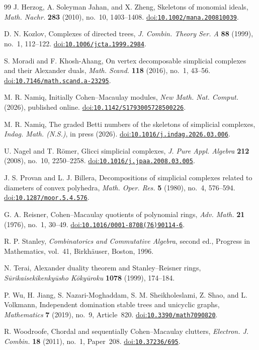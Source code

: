 \documentclass[11pt]{amsart}
\theoremstyle{definition}
\newcommand{\doi}[1]{\href{https://doi.org/#1}{doi:\nolinkurl{#1}}}
\begin{document}
\begin{thebibliography}{99}
		J. Herzog, A. Soleyman Jahan, and X. Zheng, Skeletons of monomial ideals, \emph{Math. Nachr.} \textbf{283} (2010), no.~10, 1403--1408. \doi{10.1002/mana.200810039}.
		
		D. N. Kozlov, Complexes of directed trees, \emph{J. Combin. Theory Ser. A} \textbf{88} (1999), no.~1, 112--122. \doi{10.1006/jcta.1999.2984}.
		
		S. Moradi and F. Khosh-Ahang, On vertex decomposable simplicial complexes and their Alexander duals, \emph{Math. Scand.} \textbf{118} (2016), no.~1, 43--56. \doi{10.7146/math.scand.a-23295}.
		
		M. R. Namiq, Initially Cohen--Macaulay modules, \emph{New Math. Nat. Comput.} (2026), published online. \doi{10.1142/S1793005728500226}.
		
		M. R. Namiq, The graded Betti numbers of the skeletons of simplicial complexes, \emph{Indag. Math. (N.S.)}, in press (2026). \doi{10.1016/j.indag.2026.03.006}.
		
		U. Nagel and T. R\"omer, Glicci simplicial complexes, \emph{J. Pure Appl. Algebra} \textbf{212} (2008), no.~10, 2250--2258. \doi{10.1016/j.jpaa.2008.03.005}.
		
		J. S. Provan and L. J. Billera, Decompositions of simplicial complexes related to diameters of convex polyhedra, \emph{Math. Oper. Res.} \textbf{5} (1980), no.~4, 576--594. \doi{10.1287/moor.5.4.576}.
		
		G. A. Reisner, Cohen--Macaulay quotients of polynomial rings, \emph{Adv. Math.} \textbf{21} (1976), no.~1, 30--49. \doi{10.1016/0001-8708(76)90114-6}.
		
		R. P. Stanley, \emph{Combinatorics and Commutative Algebra}, second ed., Progress in Mathematics, vol.~41, Birkh\"auser, Boston, 1996.
		
		N. Terai, Alexander duality theorem and Stanley--Reisner rings, \emph{S\=urikaisekikenky\=usho K\=oky\=uroku} \textbf{1078} (1999), 174--184.
		
		 P. Wu, H. Jiang, S. Nazari-Moghaddam, S. M. Sheikholeslami, Z. Shao, and L. Volkmann, Independent domination stable trees and unicyclic graphs, \emph{Mathematics} \textbf{7} (2019), no.~9, Article~820. \doi{10.3390/math7090820}.
		
		R. Woodroofe, Chordal and sequentially Cohen--Macaulay clutters, \emph{Electron. J. Combin.} \textbf{18} (2011), no.~1, Paper~208. \doi{10.37236/695}.
		
	\end{thebibliography}
	
\end{document}

